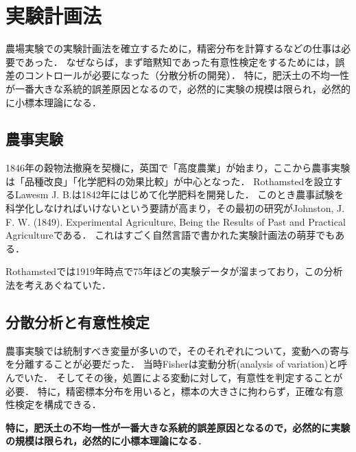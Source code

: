\documentclass[uplatex,dvipdfmx]{jsreport}
\begin{document}
\section{実験計画法}

\begin{tcolorbox}[colframe=ForestGreen, colback=ForestGreen!10!white,breakable,colbacktitle=ForestGreen!40!white,coltitle=black,fonttitle=\bfseries\sffamily,
title=]
    農場実験での実験計画法を確立するために，精密分布を計算するなどの仕事は必要であった．
    なぜならば，まず暗黙知であった有意性検定をするためには，誤差のコントロールが必要になった（分散分析の開発）．
    特に，肥沃土の不均一性が一番大きな系統的誤差原因となるので，必然的に実験の規模は限られ，必然的に小標本理論になる．
\end{tcolorbox}

\subsection{農事実験}

\begin{history}[高度農業]
    1846年の穀物法撤廃を契機に，英国で「高度農業」が始まり，ここから農事実験は「品種改良」「化学肥料の効果比較」が中心となった．
    Rothamstedを設立するLawesm J. B.は1842年にはじめて化学肥料を開発した．
    このとき農事試験を科学化しなければいけないという要請が高まり，その最初の研究がJohnston, J. F. W. (1849). Experimental Agriculture, Being the Results of Past and Practical Agricultureである．
    これはすごく自然言語で書かれた実験計画法の萌芽でもある．
\end{history}

\begin{history}
    Rothamstedでは1919年時点で75年ほどの実験データが溜まっており，この分析法を考えあぐねていた．
\end{history}

\subsection{分散分析と有意性検定}

\begin{tcolorbox}[colframe=ForestGreen, colback=ForestGreen!10!white,breakable,colbacktitle=ForestGreen!40!white,coltitle=black,fonttitle=\bfseries\sffamily,
title=]
    農事実験では統制すべき変量が多いので，そのそれぞれについて，変動への寄与を分離することが必要だった．
    当時Fisherは変動分析(analysis of variation)と呼んでいた．
    そしてその後，処置による変動に対して，有意性を判定することが必要．
    特に，精密標本分布を用いると，標本の大きさに拘わらず，正確な有意性検定を構成できる．

    \textbf{特に，肥沃土の不均一性が一番大きな系統的誤差原因となるので，必然的に実験の規模は限られ，必然的に小標本理論になる}．
\end{tcolorbox}
\end{document}
